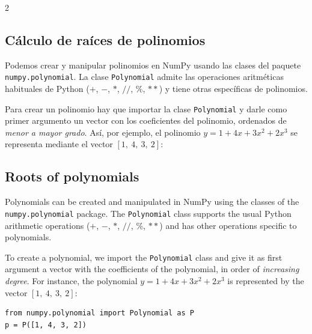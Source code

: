 \begin{paracol}{2}
\subsection{Cálculo de raíces de polinomios} 

Podemos crear y manipular polinomios en NumPy usando las clases del paquete \texttt{numpy.polynomial}. La clase \texttt{Polynomial} admite las operaciones aritméticas habituales de Python ($+$, $-$, $*$, $//$, $\%$, $**$) y tiene otras específicas de polinomios.

Para crear un polinomio hay que importar la clase \texttt{Polynomial} y darle como primer argumento un vector con los coeficientes del polinomio, ordenados de \emph{menor a mayor grado}. Así, por ejemplo, el polinomio $y=1 + 4x + 3x^2+2x^3$ se representa mediante el vector $[1,\ 4,\ 3,\ 2]$:

\switchcolumn

\subsection{Roots of polynomials}
Polynomials can be created and manipulated in NumPy using the classes of the \texttt{numpy.polynomial} package. The \texttt{Polynomial} class supports the usual Python arithmetic operations ($+$, $-$, $*$, $//$, $\%$, $**$) and has other operations specific to polynomials.

To create a polynomial, we import the \texttt{Polynomial} class and give it as first argument a vector with the coefficients of the polynomial, in order of \emph{increasing degree}. For instance, the polynomial $y=1 + 4x + 3x^2+2x^3$ is represented by the vector $[1,\ 4,\ 3,\ 2]$:
\end{paracol}

\begin{verbatim}
from numpy.polynomial import Polynomial as P
p = P([1, 4, 3, 2])
\end{verbatim}

